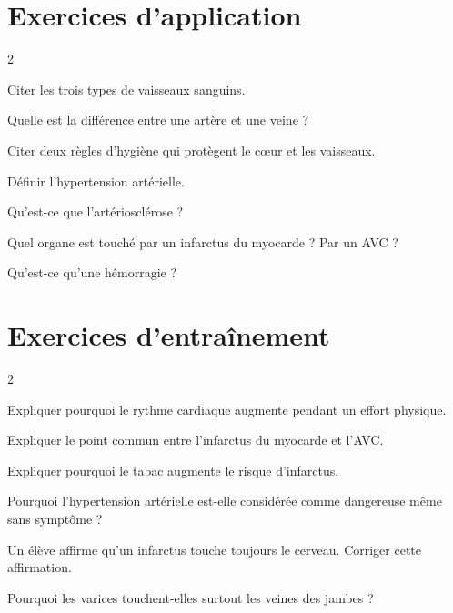 \section{Exercices d'application}
\begin{multicols}{2}

\exo{} Citer les trois types de vaisseaux sanguins.

\exo{} Quelle est la différence entre une artère et une veine ?

\exo{} Citer deux règles d'hygiène qui protègent le cœur et les vaisseaux.

\exo{} Définir l'hypertension artérielle.

\exo{} Qu'est-ce que l'artériosclérose ?

\exo{} Quel organe est touché par un infarctus du myocarde ? Par un AVC ?

\exo{} Qu'est-ce qu'une hémorragie ?

\end{multicols}

\section{Exercices d'entraînement}
\begin{multicols}{2}

\exo{} Expliquer pourquoi le rythme cardiaque augmente pendant un effort
physique.

\exo{} Expliquer le point commun entre l'infarctus du myocarde et l'AVC.

\exo{} Expliquer pourquoi le tabac augmente le risque d'infarctus.

\exo{} Pourquoi l'hypertension artérielle est-elle considérée comme
dangereuse même sans symptôme ?

\exo{} Un élève affirme qu'un infarctus touche toujours le cerveau. Corriger
cette affirmation.

\exo{} Pourquoi les varices touchent-elles surtout les veines des jambes ?

\end{multicols}

